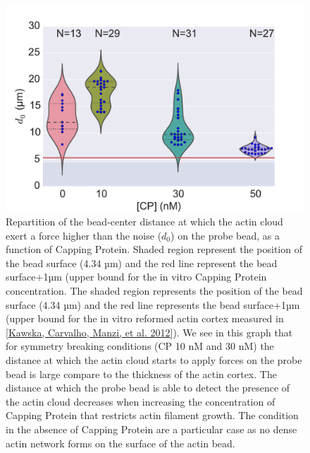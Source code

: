 \documentclass[A4paperpaper,11pt,english]{sphinxmanual}
\begin{document}
\begin{figure}[htbp]
\centering
\capstart

\includegraphics[width=0.650\linewidth]{d0_violin.pdf}
\caption{Repartition of the bead-center distance at which the actin cloud exert a
force higher than the noise (\(d_0\)) on the probe bead, as a function of
Capping Protein. Shaded region represent the position of the bead surface
(4.34 µm) and the red line represent the bead surface+1µm (upper bound for
the in vitro
Capping Protein concentration. The shaded region represents the position of
the bead surface (4.34 µm) and the red line represents the bead surface+1µm
(upper bound for the in vitro
reformed actin cortex measured in {\hyperref[index-latex:kawska2012]{{[}Kawska, Carvalho, Manzi,  et al.  2012{]}}}). We see in this graph that for symmetry breaking
conditions (CP 10 nM and 30 nM) the distance at which the actin cloud starts to apply
forces on the probe bead is large compare to the thickness of the actin
cortex. The distance at which the probe bead is able to detect the presence
of the actin cloud decreases when increasing the concentration of Capping
Protein that restricts  actin filament growth. The condition in the absence
of Capping Protein are a particular case as no dense actin network forms
on the surface of the actin bead.}\label{index-latex:d0-violin}\end{figure}
\end{document}
